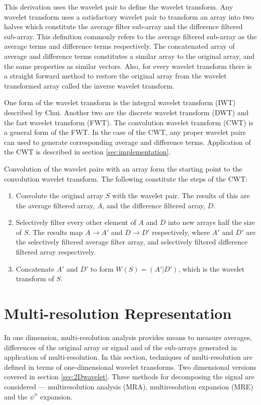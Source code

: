 This derivation uses the wavelet pair to define the wavelet transform.
Any wavelet transform uses a satisfactory wavelet pair to transform an
array into two halves which constitute the average filter sub-array
and the difference filtered sub-array.  This definition commonly
refers to the average filtered sub-array as the average terms and
difference terms respectively.  The concatenated array of average and
difference terms constitutes a similar array to the original array,
and the same properties as similar vectors.  Also, for every wavelet
transform there is a straight forward method to restore the original
array from the wavelet transformed array called the inverse wavelet
transform.

One form of the wavelet transform is the integral wavelet transform
(IWT) described by Chui.  Another two are the discrete wavelet
transform (DWT) and the fast wavelet transform (FWT).  The convolution
wavelet transform (CWT) is a general form of the FWT.  In the case of
the CWT, any proper wavelet pairs can used to generate corresponding
average and difference terms.  Application of the CWT is described in
section \ref{sec:implementation}.

Convolution of the wavelet pairs with an array form the starting point to the convolution wavelet transform.  The following constitute the steps of the CWT:
\begin{enumerate}
\item Convolute the original array $S$ with the wavelet pair.  The results of this are the average filtered array, $A$, and the difference filtered array, $D$.  
\item Selectively filter every other element of $A$ and $D$ into new arrays half the size of $S$.  The results map $A\to A'$ and $D\to D'$ respectively, where $A'$ and $D'$ are the selectively filtered average filter array, and selectively filtered difference filtered array respectively.  
\item Concatenate $A'$ and $D'$ to form $W(S) = (A'|D')$, which is the wavelet transform of $S$.
\end{enumerate}

\section{Multi-resolution Representation} \label{sec:multiresolution}

In one dimension, multi-resolution analysis provides means to measure
averages, differences of the original array or signal and of the sub-arrays
generated in application of multi-resolution.  In this section,
techniques of multi-resolution are defined in terms of one-dimensional
wavelet transforms.  Two dimensional versions covered in section
\ref{sec:2Dwavelet}. Three methods for decomposing the signal are considered --- multiresolution analysis (MRA), multiresolution expansion (MRE) and the $\psi^n$ expansion.

